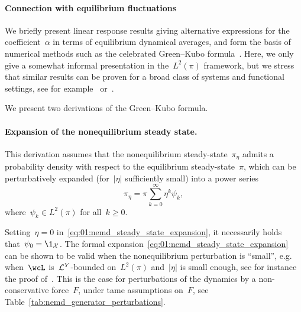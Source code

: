 
\paragraph{Connection with equilibrium fluctuations}
\label{subsec:linear_response_theory}
We briefly present linear response results giving alternative expressions for the coefficient~$\alpha$ in terms of equilibrium dynamical averages, and form the basis of numerical methods such as the celebrated Green--Kubo formula~\cite{G54,K57a,K57b}. Here, we only give a somewhat informal presentation in the~$L^2(\pi)$ framework, but we stress that similar results can be proven for a broad class of systems and functional settings, see for example~\cite{H10} or~\cite[Section 5.2]{LS16}.

We present two derivations of the Green--Kubo formula.
\paragraph{Expansion of the nonequilibrium steady state.}
This derivation assumes that the nonequilibrium steady-state~$\pi_\eta$ admits a probability density with respect to the equilibrium steady-state~$\pi$, which can be perturbatively expanded (for~$|\eta|$ sufficiently small) into a power series
\begin{equation}
    \label{eq:01:nemd_steady_state_expansion}
    \pi_\eta=\pi\sum_{k=0}^\infty \eta^k\psi_k,
\end{equation}
where~$\psi_k\in L^2(\pi)$ for all~$k\geq 0$.

Setting~$\eta=0$ in~\eqref{eq:01:nemd_steady_state_expansion}, it necessarily holds that~$\psi_0=\1_{\cX}$.
The formal expansion~\eqref{eq:01:nemd_steady_state_expansion} can be shown to be valid when the nonequilibrium perturbation is ``small'', e.g. when~$\wcL$ is~$\mathcal{L}^Y$-bounded on~$L^2(\pi)$ and~$|\eta|$ is small enough, see for instance the proof of~\cite[Theorem 5.2]{LS16}. This is the case for perturbations of the dynamics by a non-conservative force~$F$, under tame assumptions on~$F$, see Table~\ref{tab:nemd_generator_perturbations}.

